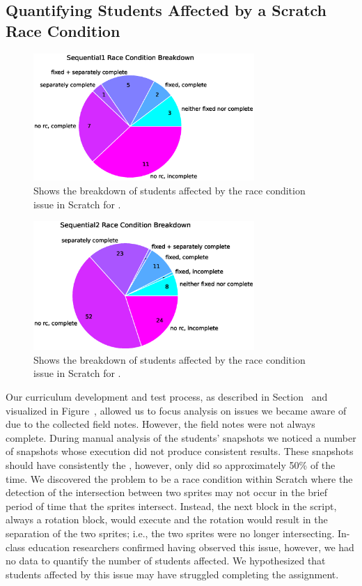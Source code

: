 \subsection{Quantifying Students Affected by a Scratch Race Condition}

\begin{figure}[!t]
\centering \includegraphics[width=3.3in]{graphs/race_condition_Sequential1.eps}
\caption{Shows the breakdown of students affected by the race condition issue
  in Scratch for \sone{}.}
\end{figure}

\begin{figure}[!t]
\centering \includegraphics[width=3.3in]{graphs/race_condition_Sequential2.eps}
\caption{Shows the breakdown of students affected by the race condition issue
  in Scratch for \stwo{}.}
\end{figure}

Our curriculum development and test process, as described in
Section~ and visualized in Figure~,
allowed us to focus analysis on issues we became aware of due to the collected
field notes. However, the field notes were not always complete. During manual
analysis of the students' snapshots we noticed a number of snapshots whose
execution did not produce consistent results. These snapshots should have
consistently \caught{} the \zebra{}, however, only did so approximately 50\% of
the time. We discovered the problem to be a race condition within Scratch where
the detection of the intersection between two sprites may not occur in the
brief period of time that the sprites intersect. Instead, the next block in the
script, always a rotation block, would execute and the rotation would result in
the separation of the two sprites; i.e., the two sprites were no longer
intersecting. In-class education researchers confirmed having observed this
issue, however, we had no data to quantify the number of students affected. We
hypothesized that students affected by this issue may have struggled completing
the assignment.


